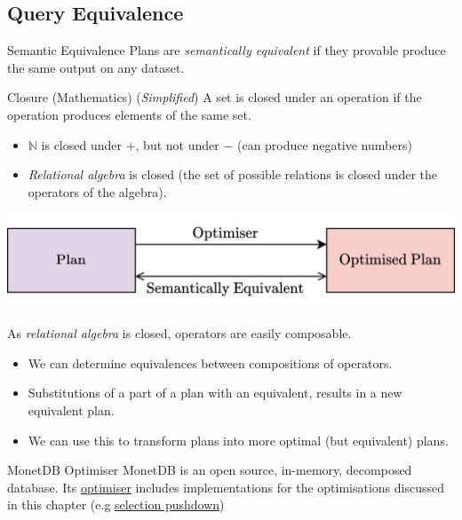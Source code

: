 \subsection{Query Equivalence}
\begin{definitionbox}{Semantic Equivalence}
    Plans are \textit{semantically equivalent} if they provable produce the same output on any dataset.
\end{definitionbox}
\begin{definitionbox}{Closure (Mathematics)}
    (\textit{Simplified}) A set is closed under an operation if the operation produces elements of the same set.
    \begin{itemize}
        \item $\mathbb{N}$ is closed under $+$, but not under $-$ (can produce negative numbers)
        \item \textit{Relational algebra} is closed (the set of possible relations is closed under the operators of the algebra).
    \end{itemize}
\end{definitionbox}
\begin{center}
    \includegraphics[width=.7\textwidth]{optimisation/images/semantic_equivalence.drawio.png}
\end{center}
As \textit{relational algebra} is closed, operators are easily composable.
\begin{itemize}
    \item We can determine equivalences between compositions of operators.
    \item Substitutions of a part of a plan with an equivalent, results in a new equivalent plan.
    \item We can use this to transform plans into more optimal (but equivalent) plans. 
\end{itemize}

\begin{sidenotebox}{MonetDB Optimiser}
    MonetDB is an open source, in-memory, decomposed database. Its \href{https://github.com/MonetDB/MonetDB/blob/master/monetdb5/optimizer/optimizer.c}{optimiser} includes implementations for the optimisations discussed in this chapter (e.g \href{https://github.com/MonetDB/MonetDB/blob/master/monetdb5/optimizer/opt_pushselect.c}{selection pushdown})
\end{sidenotebox}

